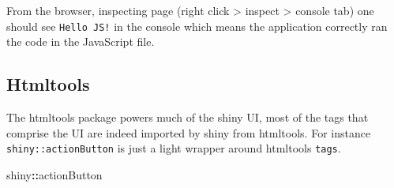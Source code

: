 \documentclass[
  10pt,
]{krantz}
\makeatletter
\newenvironment{Shaded}{\begin{snugshade}}{\end{snugshade}}
\newcommand{\CommentTok}[1]{\textcolor[rgb]{0.37,0.37,0.37}{\textit{#1}}}
\newcommand{\ControlFlowTok}[1]{\textcolor[rgb]{0.27,0.27,0.27}{\textbf{#1}}}
\newcommand{\DataTypeTok}[1]{\textcolor[rgb]{0.27,0.27,0.27}{#1}}
\newcommand{\KeywordTok}[1]{\textcolor[rgb]{0.27,0.27,0.27}{\textbf{#1}}}
\newcommand{\NormalTok}[1]{#1}
\newcommand{\OperatorTok}[1]{\textcolor[rgb]{0.43,0.43,0.43}{\textbf{#1}}}
\newcommand{\StringTok}[1]{\textcolor[rgb]{0.5,0.5,0.5}{#1}}
\newenvironment{kframe}{%
\medskip{}
\setlength{\fboxsep}{.8em}
 \def\at@end@of@kframe{}%
 \ifinner\ifhmode%
  \def\at@end@of@kframe{\end{minipage}}%
  \begin{minipage}{\columnwidth}%
 \fi\fi%
 \def\FrameCommand##1{\hskip\@totalleftmargin \hskip-\fboxsep
 \colorbox{shadecolor}{##1}\hskip-\fboxsep
     \hskip-\linewidth \hskip-\@totalleftmargin \hskip\columnwidth}%
 \MakeFramed {\advance\hsize-\width
   \@totalleftmargin\z@ \linewidth\hsize
   \@setminipage}}%
 {\par\unskip\endMakeFramed%
 \at@end@of@kframe}
\renewenvironment{Shaded}{\begin{kframe}}{\end{kframe}}
\makeatother
\begin{document}
\begin{Shaded}
\end{Shaded}

From the browser, inspecting page (right click \textgreater{} inspect \textgreater{} console tab) one should see \texttt{Hello\ JS!} in the console which means the application correctly ran the code in the JavaScript file.

\hypertarget{basics-htmltools}{%
\subsection{Htmltools}\label{basics-htmltools}}

The htmltools package powers much of the shiny UI, most of the tags that comprise the UI are indeed imported by shiny from htmltools. For instance \texttt{shiny::actionButton} is just a light wrapper around htmltools \texttt{tags}.

\begin{Shaded}
\begin{Highlighting}[]
\NormalTok{shiny}\OperatorTok{::}\NormalTok{actionButton}
\end{Highlighting}
\end{Shaded}
\end{document}
